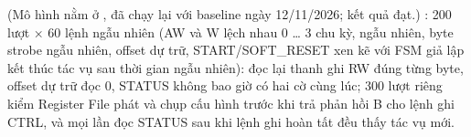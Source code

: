 \documentclass[10pt,a4paper]{article}
\begin{document}
\begin{notebox}
(Mô hình nằm ở , đã chạy lại với baseline ngày 12/11/2026; kết quả đạt.) : 200 lượt × 60 lệnh ngẫu nhiên (AW và W lệch nhau 0 … 3 chu kỳ,  ngẫu nhiên, byte strobe ngẫu nhiên, offset dự trữ, START/SOFT\_RESET xen kẽ với FSM giả lập kết thúc tác vụ sau thời gian ngẫu nhiên): đọc lại thanh ghi RW đúng từng byte, offset dự trữ đọc 0, STATUS không bao giờ có hai cờ cùng lúc; 300 lượt riêng kiểm Register File phát  và chụp cấu hình trước khi trả phản hồi B cho lệnh ghi CTRL, và mọi lần đọc STATUS sau khi lệnh ghi hoàn tất đều thấy tác vụ mới.
\end{notebox}
\end{document}
